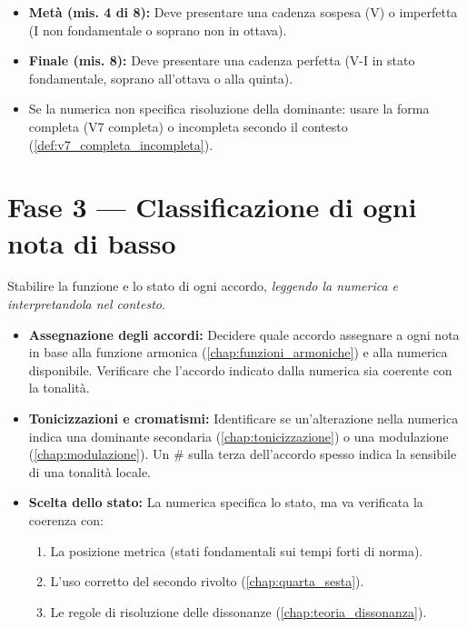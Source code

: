 \begin{regola}
	\label{reg:pianificazione_cadenzale_numerato}
	\begin{itemize}
		\item \textbf{Metà (mis. 4 di 8):} Deve presentare una cadenza sospesa (V) o imperfetta (I non fondamentale o soprano non in ottava).
		\item \textbf{Finale (mis. 8):} Deve presentare una cadenza perfetta (V-I in stato fondamentale, soprano all'ottava o alla quinta).
		\item Se la numerica non specifica risoluzione della dominante: usare la forma completa (V7 completa) o incompleta secondo il contesto (\ref{def:v7_completa_incompleta}).
	\end{itemize}
\end{regola}

\section{Fase 3 — Classificazione di ogni nota di basso}
\label{sec:fase3_numerato}

Stabilire la funzione e lo stato di ogni accordo, \textit{leggendo la numerica e interpretandola nel contesto}.

\begin{itemize}
	\item \textbf{Assegnazione degli accordi:} Decidere quale accordo assegnare a ogni nota in base alla funzione armonica (\ref{chap:funzioni_armoniche}) e alla numerica disponibile. Verificare che l'accordo indicato dalla numerica sia coerente con la tonalità.
	\item \textbf{Tonicizzazioni e cromatismi:} Identificare se un'alterazione nella numerica indica una dominante secondaria (\ref{chap:tonicizzazione}) o una modulazione (\ref{chap:modulazione}). Un \# sulla terza dell'accordo spesso indica la sensibile di una tonalità locale.
	\item \textbf{Scelta dello stato:} La numerica specifica lo stato, ma va verificata la coerenza con:
		\begin{enumerate}
			\item La posizione metrica (stati fondamentali sui tempi forti di norma).
			\item L'uso corretto del secondo rivolto (\ref{chap:quarta_sesta}).
			\item Le regole di risoluzione delle dissonanze (\ref{chap:teoria_dissonanza}).
		\end{enumerate}
\end{itemize}

